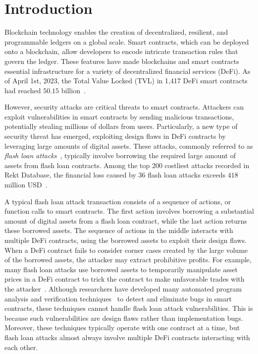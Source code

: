 
\section{Introduction}
\label{sec:intro}

Blockchain technology enables the creation of decentralized, resilient, and
programmable ledgers on a global scale. Smart contracts, which can be deployed
onto a blockchain, allow developers to encode intricate transaction rules that
govern the ledger. These features have made blockchains and smart contracts
essential infrastructure for a variety of decentralized financial services
(DeFi). As of April 1st, 2023, the Total Value Locked (TVL) in 1,417 DeFi smart
contracts had reached $50.15$ billion~\cite{DeFillama}.

However, security attacks are critical threats to smart contracts. Attackers
can exploit vulnerabilities in smart contracts by sending malicious
transactions, potentially stealing millions of dollars from users.
Particularly, a new type of security threat has emerged, exploiting design
flaws in DeFi contracts by leveraging large amounts of digital assets. These
attacks, commonly referred to as \emph{flash loan attacks}~\cite{SlowMistStats,
mckay2022defi, zhang2023demystifying}, 
typically involve borrowing the required large amount of assets
from flash loan contracts. Among the top $200$ costliest attacks recorded in
Rekt Database,  the financial loss caused by $36$ flash loan attacks exceeds
$418$ million USD~\cite{mckay2022defi}. 


A typical flash loan attack transaction consists of a sequence of actions, or
function calls to smart contracts. The first action involves borrowing a
substantial amount of digital assets from a flash loan contract, while the last
action returns these borrowed assets. The sequence of actions in the middle
interacts with multiple DeFi contracts, using the borrowed assets to exploit
their design flaws. When a DeFi contract fails to consider corner cases created
by the large volume of the borrowed assets, the attacker may extract
prohibitive profits. For example, many flash loan attacks use borrowed assets
to temporarily manipulate asset prices in a DeFi contract to trick the contract
to make unfavorable trades with the
attacker~\cite{qin2021attacking,cao2021flashot}. Although researchers have
developed many automated program analysis and verification
techniques~\cite{mossberg2019manticore,feng2019precise, grieco2020echidna,
brent2020ethainter} to detect and eliminate bugs in smart contracts, these
techniques cannot handle flash loan attack vulnerabilities. This is because
such vulnerabilities are design flaws rather than implementation bugs.
Moreover, these techniques typically operate with one contract at a time, but
flash loan attacks almost always involve multiple DeFi contracts interacting
with each other.


